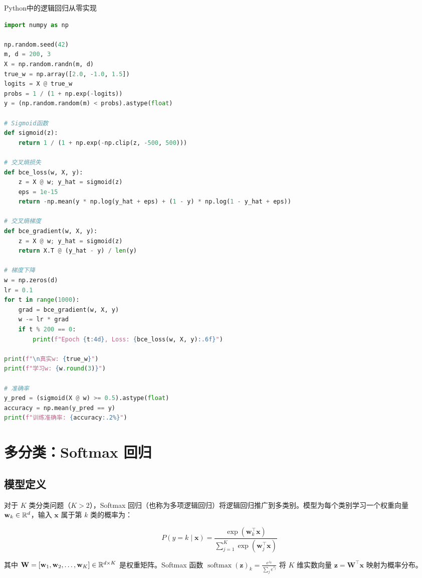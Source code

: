 \begin{mycode}{Python中的逻辑回归从零实现}
\begin{lstlisting}[language=Python]
import numpy as np

np.random.seed(42)
m, d = 200, 3
X = np.random.randn(m, d)
true_w = np.array([2.0, -1.0, 1.5])
logits = X @ true_w
probs = 1 / (1 + np.exp(-logits))
y = (np.random.random(m) < probs).astype(float)

# Sigmoid函数
def sigmoid(z):
    return 1 / (1 + np.exp(-np.clip(z, -500, 500)))

# 交叉熵损失
def bce_loss(w, X, y):
    z = X @ w; y_hat = sigmoid(z)
    eps = 1e-15
    return -np.mean(y * np.log(y_hat + eps) + (1 - y) * np.log(1 - y_hat + eps))

# 交叉熵梯度
def bce_gradient(w, X, y):
    z = X @ w; y_hat = sigmoid(z)
    return X.T @ (y_hat - y) / len(y)

# 梯度下降
w = np.zeros(d)
lr = 0.1
for t in range(1000):
    grad = bce_gradient(w, X, y)
    w -= lr * grad
    if t % 200 == 0:
        print(f"Epoch {t:4d}, Loss: {bce_loss(w, X, y):.6f}")

print(f"\n真实w: {true_w}")
print(f"学习w: {w.round(3)}")

# 准确率
y_pred = (sigmoid(X @ w) >= 0.5).astype(float)
accuracy = np.mean(y_pred == y)
print(f"训练准确率: {accuracy:.2%}")
\end{lstlisting}
\end{mycode}

\section{多分类：Softmax 回归}

\subsection{模型定义}

对于 $K$ 类分类问题（$K>2$），Softmax 回归（也称为多项逻辑回归）将逻辑回归推广到多类别。模型为每个类别学习一个权重向量 $\mathbf{w}_k\in\mathbb{R}^d$，输入 $\mathbf{x}$ 属于第 $k$ 类的概率为：

\[
P(y=k\mid\mathbf{x}) = \frac{\exp(\mathbf{w}_k^{\top}\mathbf{x})}{\sum_{j=1}^{K}\exp(\mathbf{w}_j^{\top}\mathbf{x})}
\]

其中 $\mathbf{W}=[\mathbf{w}_1,\mathbf{w}_2,\ldots,\mathbf{w}_K]\in\mathbb{R}^{d\times K}$ 是权重矩阵。Softmax 函数 $\operatorname{softmax}(\mathbf{z})_k = \frac{e^{z_k}}{\sum_j e^{z_j}}$ 将 $K$ 维实数向量 $\mathbf{z}=\mathbf{W}^{\top}\mathbf{x}$ 映射为概率分布。

